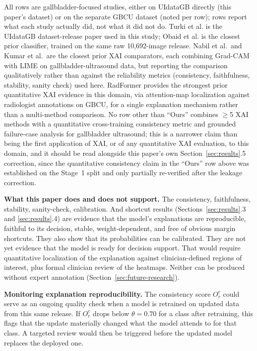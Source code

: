 \begin{table}[!ht]
\vspace{2pt}
\raggedright\footnotesize All rows are gallbladder-focused studies, either on UIdataGB directly (this paper's dataset) or on the separate GBCU dataset (noted per row); rows report what each study actually did, not what it did not do. Turki et al. is the UIdataGB dataset-release paper used in this study; Obaid et al. is the closest prior classifier, trained on the same raw 10,692-image release. Nabil et al.\ and Kumar et al.\ are the closest prior XAI comparators, each combining Grad-CAM with LIME on gallbladder-ultrasound data, but reporting the comparison qualitatively rather than against the reliability metrics (consistency, faithfulness, stability, sanity check) used here. RadFormer provides the strongest prior quantitative XAI evidence in this domain, via attention-map localization against radiologist annotations on GBCU, for a single explanation mechanism rather than a multi-method comparison. No row other than ``Ours'' combines $\ge$5 XAI methods with a quantitative cross-training consistency metric and grounded failure-case analysis for gallbladder ultrasound; this is a narrower claim than being the first application of XAI, or of any quantitative XAI evaluation, to this domain, and it should be read alongside this paper's own Section~\ref{sec:results}.5 correction, since the quantitative consistency claim in the ``Ours'' row above was established on the Stage~1 split and only partially re-verified after the leakage correction.
\end{table}

\textbf{What this paper does and does not support.} The consistency, faithfulness, stability, sanity-check, calibration. And shortcut results (Sections~\ref{sec:results}.3 and \ref{sec:results}.4) are evidence that the model's explanations are reproducible, faithful to its decision, stable, weight-dependent, and free of obvious margin shortcuts. They also show that its probabilities can be calibrated. They are not yet evidence that the model is ready for decision support. That would require quantitative localization of the explanation against clinician-defined regions of interest, plus formal clinician review of the heatmaps. Neither can be produced without expert annotation (Section~\ref{sec:future-research}).

\textbf{Monitoring explanation reproducibility.} The consistency score $O_r^c$ could serve as an ongoing quality check when a model is retrained on updated data from this same release. If $O_r^c$ drops below $\theta=0.70$ for a class after retraining, this flags that the update materially changed what the model attends to for that class. A targeted review would then be triggered before the updated model replaces the deployed one.


